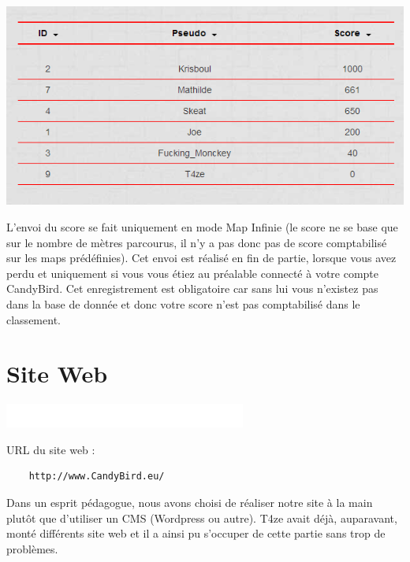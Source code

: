 \documentclass [11pt]{report}
\begin{document}
	\begin{center}
		\includegraphics[scale = 0.6]{images/classement.png}
	\end{center}
			
	
	
	\vspace{10mm}

	L'envoi du score se fait uniquement en mode Map Infinie (le score ne se base que sur le nombre de mètres parcourus, il n'y a pas donc pas de score comptabilisé sur les maps prédéfinies). Cet envoi est réalisé en fin de partie, lorsque vous avez perdu et uniquement si vous vous étiez au préalable connecté à votre compte CandyBird. Cet enregistrement est obligatoire car sans lui vous n'existez pas dans la base de donnée et donc votre score n'est pas comptabilisé dans le classement.
	 
	 \newpage
	 
	\section{Site Web}
	
	\begin{center}
				\includegraphics[scale = 0.3]{images/blanc.png}
			\end{center}
	
	\noindent URL du site web : 
	\begin{Verbatim}
	http://www.CandyBird.eu/
	\end{Verbatim}
	
	\vspace{6mm}
	
	Dans un esprit pédagogue, nous avons choisi de réaliser notre site à la main plutôt que d'utiliser un CMS (Wordpress ou autre). T4ze avait déjà, auparavant, monté différents site web et il a ainsi pu s'occuper de cette partie sans trop de problèmes.
	
\end{document}
